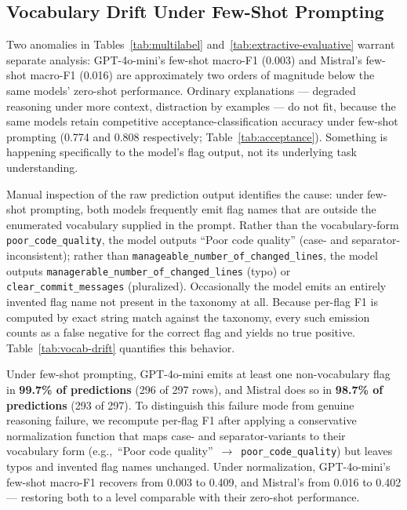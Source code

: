 \subsection{Vocabulary Drift Under Few-Shot
Prompting}\label{sec:results-drift}

Two anomalies in Tables~\ref{tab:multilabel}
and~\ref{tab:extractive-evaluative} warrant separate analysis:
GPT-4o-mini's few-shot macro-F1 (0.003) and Mistral's few-shot
macro-F1 (0.016) are approximately two orders of magnitude below the
same models' zero-shot performance.  Ordinary explanations ---
degraded reasoning under more context, distraction by examples --- do
not fit, because the same models retain competitive
acceptance-classification accuracy under few-shot prompting (0.774
and 0.808 respectively; Table~\ref{tab:acceptance}).  Something is
happening specifically to the model's flag output, not its underlying
task understanding.

Manual inspection of the raw prediction output identifies the cause:
under few-shot prompting, both models frequently emit flag names that
are outside the enumerated vocabulary supplied in the prompt.  Rather
than the vocabulary-form \texttt{poor\_code\_quality}, the model
outputs ``Poor code quality'' (case- and separator-inconsistent);
rather than \texttt{manageable\_number\_of\_changed\_lines}, the model
outputs \texttt{managerable\_number\_of\_changed\_lines} (typo) or
\texttt{clear\_commit\_messages} (pluralized).  Occasionally the model
emits an entirely invented flag name not present in the taxonomy at
all.  Because per-flag F1 is computed by exact string match against
the taxonomy, every such emission counts as a false negative for the
correct flag and yields no true positive.
Table~\ref{tab:vocab-drift} quantifies this behavior.


Under few-shot prompting, GPT-4o-mini emits at least one
non-vocabulary flag in \textbf{99.7\% of predictions} (296 of 297
rows), and Mistral does so in \textbf{98.7\% of predictions} (293 of
297).  To distinguish this failure mode from genuine reasoning
failure, we recompute per-flag F1 after applying a conservative
normalization function that maps case- and separator-variants to their
vocabulary form (e.g.,\ ``Poor code
quality''~$\rightarrow$~\texttt{poor\_code\_quality}) but leaves typos
and invented flag names unchanged.  Under normalization,
GPT-4o-mini's few-shot macro-F1 recovers from 0.003 to 0.409, and
Mistral's from 0.016 to 0.402 --- restoring both to a level comparable
with their zero-shot performance.


